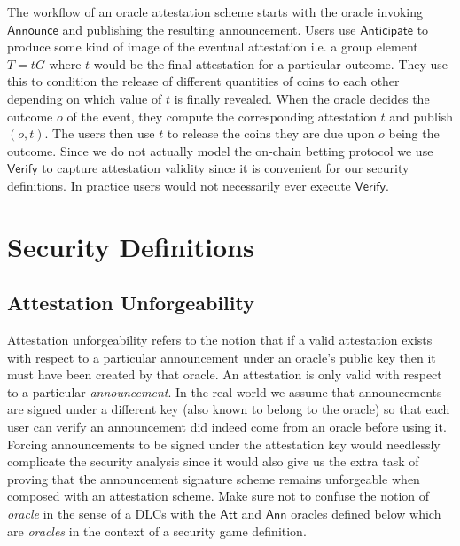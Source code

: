\documentclass[runningheads]{llncs}
\newcommand{\Verify}{\mathsf{Verify}}
\newcommand{\Announce}{\mathsf{Announce}}
\newcommand{\AnnO}{\mathsf{Ann}}
\newcommand{\AttO}{\mathsf{Att}}
\newcommand{\Anticipate}{\mathsf{Anticipate}}
\newcommand{\att}{t}
\newcommand{\Att}{T}
\begin{document}
The workflow of an oracle attestation scheme starts with the oracle invoking $\Announce$ and publishing the resulting announcement.
Users use $\Anticipate$ to produce some kind of image of the eventual attestation i.e. a group element $\Att = \att{}G$ where $\att$ would be the final attestation for a particular outcome.
They use this to condition the release of different quantities of coins to each other depending on which value of $\att$ is finally revealed.
When the oracle decides the outcome $o$ of the event, they compute the corresponding attestation $\att$ and publish $(o,\att)$.
The users then use $\att$ to release the coins they are due upon $o$ being the outcome.
Since we do not actually model the on-chain betting protocol we use $\Verify$ to capture attestation validity since it is convenient for our security definitions.
In practice users would not necessarily ever execute $\Verify$.

\section{Security Definitions}

\subsection{Attestation Unforgeability}

Attestation unforgeability refers to the notion that if a valid attestation exists with respect to a particular announcement under an oracle's public key then it must have been created by that oracle.
An attestation is only valid with respect to a particular \emph{announcement}.
In the real world we assume that announcements are signed under a different key (also known to belong to the oracle) so that each user can verify an announcement did indeed come from an oracle before using it.
Forcing announcements to be signed under the attestation key would needlessly complicate the security analysis since it would also give us the extra task of proving that the announcement signature scheme remains unforgeable when composed with an attestation scheme.
Make sure not to confuse the notion of \emph{oracle} in the sense of a DLCs with the $\AttO$ and $\AnnO$ oracles defined below which are \emph{oracles} in the context of a security game definition.
\end{document}
